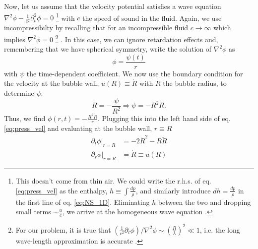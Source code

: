 \documentclass[rmp,aps,nofootinbib,superscriptaddress,floatfix]{revtex4-2}
\begin{document}
Now, let us assume that the velocity potential satisfies a wave equation $\nabla^2 \phi - \frac{1}{c^2}\partial_t^2 \phi =0 $ \footnote{This doesn't come from thin air. We could write the r.h.s. of eq. \ref{eq:press_vel} as the enthalpy, $h\equiv \int \frac{dp}{\rho}$, and similarly introduce $dh=\frac{dp}{\rho}$ in the first line of eq. \ref{eq:NS_1D}. Eliminating $h$ between the two and dropping small terms $\sim \frac{u}{c}$, we arrive at the homogeneous wave equation \cite{leighton2007derivation,brenner2002single,prosperetti1999old}.} with $c$ the speed of sound in the fluid. Again, we use incompressibilty by recalling that for an incompressible fluid $c\rightarrow \infty$ which implies $\nabla^2 \phi =0$ \footnote{For our problem, it is true that $\left( \frac{1}{c^2} \partial_t \phi \right) / \nabla^2 \phi \sim \left( \frac{R}{\lambda} \right)^2 \ll 1$, i.e. the long wave-length approximation is accurate \cite{prosperetti1999old,prosperetti1986bubble,leighton2007derivation}.} . In this case, we can ignore retardation effects and, remembering that we have spherical symmetry, write the solution of $\nabla^2 \phi$ as 
\begin{equation}
    \phi = \frac{\psi(t)}{r}
\end{equation}
with $\psi$ the time-dependent coefficient. We now use the boundary condition for the velocity at the bubble wall, $u(R)\equiv \dot{R}$ with $R$ the bubble radius, to determine $\psi$:
\begin{equation}
    \dot{R} = -\frac{\psi}{R^2} \Rightarrow \psi = -R^2 \dot{R}.
\end{equation}  
Thus, we find $\phi(r,t) = -\frac{R^2 \dot{R}}{r}$. Plugging this into the left hand side of eq. \ref{eq:press_vel} and evaluating at the bubble wall, $r\equiv R$
\begin{equation}
\begin{split}
    \partial_t \phi \vert_{r=R} & = -2\dot{R}^2-R\ddot{R} \\
    \partial_r \phi \vert_{r=R} & = \dot{R} \equiv u(R)
\end{split}
\end{equation}
\end{document}
